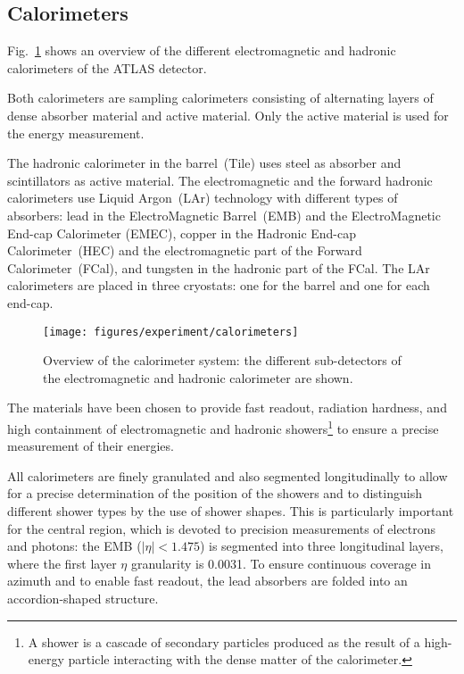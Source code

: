 \subsection{Calorimeters}
\label{sec:calorimeter}

Fig.~\ref{fig:calorimeters} shows an overview of the different electromagnetic 
and hadronic calorimeters of the ATLAS detector.

Both calorimeters are sampling calorimeters consisting of alternating layers
of dense absorber material and active material.
Only the active material is used for the energy measurement.

The hadronic calorimeter in the barrel~(Tile) uses steel as absorber
and scintillators as active material.
The electromagnetic and the forward hadronic calorimeters use Liquid
Argon~(LAr) technology with different types of absorbers:
lead in the ElectroMagnetic Barrel~(EMB) and the ElectroMagnetic
End-cap Calorimeter (EMEC), copper in the Hadronic End-cap
Calorimeter~(HEC) and the electromagnetic part of the Forward Calorimeter~(FCal),
and tungsten in the hadronic part of the FCal.
The LAr calorimeters are placed in three cryostats: one for the barrel and one for each end-cap.

\begin{figure}[ht]
\begin{center}
\texttt{[image: figures/experiment/calorimeters]}
\caption[Overview of the calorimeter system]{
  Overview of the calorimeter system:
  the different sub-detectors of the electromagnetic and hadronic calorimeter are shown.}
\label{fig:calorimeters}
\end{center}
\end{figure}

The materials have been chosen to provide fast readout, 
radiation hardness, and high containment of electromagnetic and
hadronic showers\footnote{A shower is a cascade of secondary particles produced 
as the result of a high-energy particle interacting with the dense matter of the calorimeter.} 
to ensure a precise measurement of their energies.

All calorimeters are finely granulated and also segmented
longitudinally to allow for a precise determination of the position of the showers and to
distinguish different shower types by the use of shower shapes.
This is particularly important for the central region, 
which is devoted to precision measurements of electrons and photons:
the EMB (\mbox{$|\eta| < 1.475$}) is segmented into three longitudinal
layers, where the first layer $\eta$ granularity is 0.0031.
To ensure continuous coverage in azimuth and to enable fast readout, 
the lead absorbers are folded into an accordion-shaped structure.

